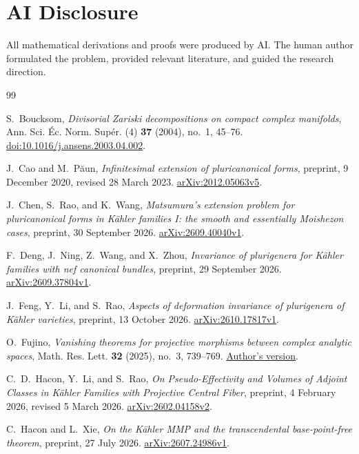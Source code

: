 \documentclass[11pt,a4paper]{article}
\theoremstyle{definition}\newtheorem{definition}[theorem]{Definition}
\theoremstyle{remark}\newtheorem*{remark}{Remark}
\begin{document}
\section*{AI Disclosure}
All mathematical derivations and proofs were produced by AI. The human
author formulated the problem, provided relevant literature, and guided
the research direction.
\begin{thebibliography}{99}

S.~Boucksom,
\emph{Divisorial Zariski decompositions on compact complex manifolds},
Ann. Sci. Éc. Norm. Supér. (4) \textbf{37} (2004), no.~1, 45--76.
\href{https://doi.org/10.1016/j.ansens.2003.04.002}{doi:10.1016/j.ansens.2003.04.002}.

J.~Cao and M.~Păun,
\emph{Infinitesimal extension of pluricanonical forms},
preprint, 9 December 2020, revised 28 March 2023.
\href{https://arxiv.org/abs/2012.05063v5}{arXiv:2012.05063v5}.

J.~Chen, S.~Rao, and K.~Wang,
\emph{Matsumura's extension problem for pluricanonical forms in
Kähler families I: the smooth and essentially Moishezon cases},
preprint, 30 September 2026.
\href{https://arxiv.org/abs/2609.40040v1}{arXiv:2609.40040v1}.

F.~Deng, J.~Ning, Z.~Wang, and X.~Zhou,
\emph{Invariance of plurigenera for Kähler families with nef canonical bundles},
preprint, 29 September 2026.
\href{https://arxiv.org/abs/2609.37804v1}{arXiv:2609.37804v1}.

J.~Feng, Y.~Li, and S.~Rao,
\emph{Aspects of deformation invariance of plurigenera of Kähler varieties},
preprint, 13 October 2026.
\href{https://arxiv.org/abs/2610.17817v1}{arXiv:2610.17817v1}.

O.~Fujino,
\emph{Vanishing theorems for projective morphisms between complex analytic spaces},
Math. Res. Lett. \textbf{32} (2025), no.~3, 739--769.
\href{https://www.math.kyoto-u.ac.jp/~fujino/analytic-vanishing18.pdf}{Author's version}.

C.~D.~Hacon, Y.~Li, and S.~Rao,
\emph{On Pseudo-Effectivity and Volumes of Adjoint Classes in Kähler
Families with Projective Central Fiber},
preprint, 4 February 2026, revised 5 March 2026.
\href{https://arxiv.org/abs/2602.04158v2}{arXiv:2602.04158v2}.

C.~Hacon and L.~Xie,
\emph{On the Kähler MMP and the transcendental base-point-free theorem},
preprint, 27 July 2026.
\href{https://arxiv.org/abs/2607.24986v1}{arXiv:2607.24986v1}.


\end{thebibliography}
\end{document}
